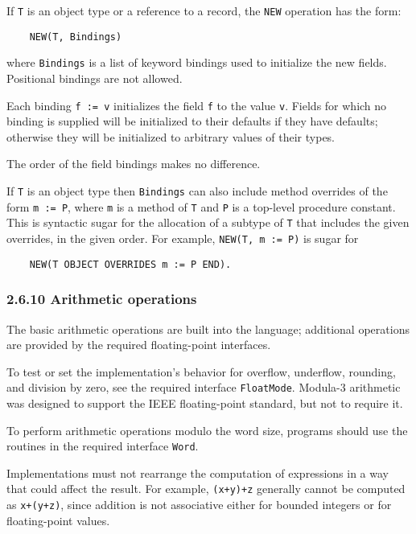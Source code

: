 \documentclass[10pt]{article}
\begin{document}
If \verb|T| is an object type or a reference to a record, the \verb|NEW|
operation has the form:
\begin{verbatim}
    NEW(T, Bindings)
\end{verbatim}
where \verb|Bindings| is a list of keyword bindings used to initialize the new
fields.  Positional bindings are not allowed.

Each binding \verb|f := v| initializes the field \verb|f| to the value
\verb|v|.  Fields for which no binding is supplied will be initialized to
their defaults if they have defaults; otherwise they will be initialized to
arbitrary values of their types.

The order of the field bindings makes no difference.

If \verb|T| is an object type then \verb|Bindings| can also include method
overrides of the form \verb|m := P|, where \verb|m| is a method of \verb|T|
and \verb|P| is a top-level procedure constant.  This is syntactic sugar for
the allocation of a subtype of \verb|T| that includes the given overrides, in
the given order.  For example, \verb|NEW(T, m := P)| is sugar for
\begin{verbatim}
    NEW(T OBJECT OVERRIDES m := P END).
\end{verbatim}

\subsubsection*{2.6.10 Arithmetic operations}

The basic arithmetic operations are built into the language; additional
operations are provided by the required floating-point interfaces.

To test or set the implementation's behavior for overflow, underflow,
rounding, and division by zero, see the required interface \verb|FloatMode|.
Modula-3 arithmetic was designed to support the IEEE floating-point standard,
but not to require it.

To perform arithmetic operations modulo the word size, programs should use the
routines in the required interface \verb|Word|.

Implementations must not rearrange the computation of expressions in a way
that could affect the result.  For example, \verb|(x+y)+z| generally cannot be
computed as \verb|x+(y+z)|, since addition is not associative either for
bounded integers or for floating-point values.
\end{document}
